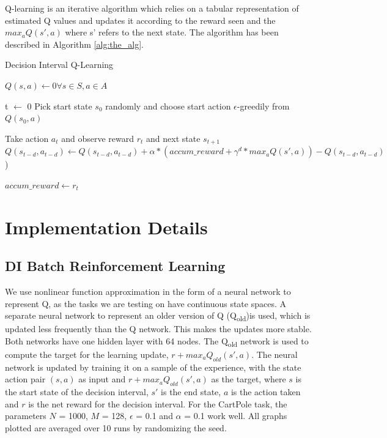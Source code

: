 \documentclass{article}
\begin{document}
Q-learning is an iterative algorithm which relies on a tabular representation of estimated Q values and updates it according to the reward seen and the $max_a Q(s', a)$ where s' refers to the next state. The algorithm has been described in Algorithm \ref{alg:the_alg}.
\begin{algorithm}
\caption{Decision Interval Q-Learning}
\label{alg:the_alg}
\begin{algorithmic}
\STATE $Q(s,a) \gets 0  \forall s \in S, a \in A$
{
\STATE t $\gets$ 0
\STATE Pick start state $s_0$ randomly and choose start action $\epsilon$-greedily from $Q(s_0,a)$

{
\STATE Take action $a_t$ and observe reward $r_t$ and next state $s_{t+1}$
\STATE $Q(s_{t-d}, a_{t-d}) \gets Q(s_{t-d}, a_{t-d}) + \alpha*(accum\_reward + \gamma^{d}*max_a Q(s', a)) - Q(s_{t-d}, a_{t-d})$)

\ENDIF
\STATE $accum\_reward \gets r_t$
\ENDIF
}
\ENDWHILE

}
\ENDWHILE

\end{algorithmic}
\end{algorithm}

\section{Implementation Details}
\subsection{DI Batch Reinforcement Learning}
We use nonlinear function approximation in the form of a neural network to represent Q, as the tasks we are testing on have continuous state spaces. A separate neural network to represent an older version of Q (Q\textsubscript{old})is used, which is updated less frequently than the Q network. This makes the updates more stable. Both networks have one hidden layer with 64 nodes. The Q\textsubscript{old} network is used to compute the target for the learning update, $r + max_a Q_{old}(s', a)$. The neural network is updated by training it on a sample of the experience, with the state action pair $(s, a)$ as input and $r + max_a Q_{old}(s', a)$ as the target, where $s$ is the start state of the decision interval, $s' $ is the end state, $a$ is the action taken and $r$ is the net reward for the decision interval. For the CartPole task, the parameters $N$ = 1000, $M$ = 128, $\epsilon$ = 0.1 and $\alpha$ = 0.1 work well. All graphs plotted are averaged over 10 runs by randomizing the seed.
\end{document}
